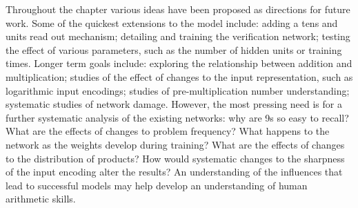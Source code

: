 Throughout the chapter various ideas have been proposed as directions for
future work. Some of the quickest extensions to the model include: adding a
tens and units read out mechanism; detailing and training the verification
network; testing the effect of various parameters, such as the number of
hidden units or training times. Longer term goals include: exploring the
relationship between addition and multiplication; studies of the effect of
changes to the input representation, such as logarithmic input encodings;
studies of pre-multiplication number understanding; systematic studies of
network damage. However, the most pressing need is for a further
systematic analysis of the existing networks: why are 9s so easy to recall?
What are the effects of changes to problem frequency?  What happens to the
network as the weights develop during training? What are the effects of
changes to the distribution of products?  How would systematic changes to
the sharpness of the input encoding alter the results?
An
understanding of the influences
that lead to successful models may help develop an understanding of human
arithmetic skills.
